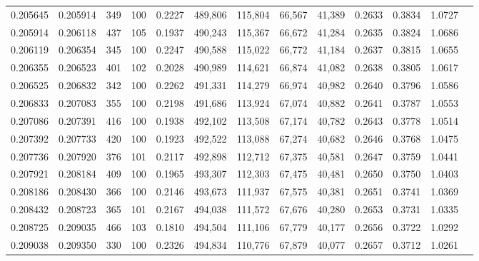 \begin{tabular}{rrrrrrrrrrrrr}
0.205645 & 0.205914 &   349 & 100 &                                     0.2227 & 489,806 & 115,804 &  66,567 &  41,389 & 0.2633 & 0.3834 & 1.0727 \\
0.205914 & 0.206118 &   437 & 105 &                                     0.1937 & 490,243 & 115,367 &  66,672 &  41,284 & 0.2635 & 0.3824 & 1.0686 \\
0.206119 & 0.206354 &   345 & 100 &                                     0.2247 & 490,588 & 115,022 &  66,772 &  41,184 & 0.2637 & 0.3815 & 1.0655 \\
0.206355 & 0.206523 &   401 & 102 &                                     0.2028 & 490,989 & 114,621 &  66,874 &  41,082 & 0.2638 & 0.3805 & 1.0617 \\
0.206525 & 0.206832 &   342 & 100 &                                     0.2262 & 491,331 & 114,279 &  66,974 &  40,982 & 0.2640 & 0.3796 & 1.0586 \\
0.206833 & 0.207083 &   355 & 100 &                                     0.2198 & 491,686 & 113,924 &  67,074 &  40,882 & 0.2641 & 0.3787 & 1.0553 \\
0.207086 & 0.207391 &   416 & 100 &                                     0.1938 & 492,102 & 113,508 &  67,174 &  40,782 & 0.2643 & 0.3778 & 1.0514 \\
0.207392 & 0.207733 &   420 & 100 &                                     0.1923 & 492,522 & 113,088 &  67,274 &  40,682 & 0.2646 & 0.3768 & 1.0475 \\
0.207736 & 0.207920 &   376 & 101 &                                     0.2117 & 492,898 & 112,712 &  67,375 &  40,581 & 0.2647 & 0.3759 & 1.0441 \\
0.207921 & 0.208184 &   409 & 100 &                                     0.1965 & 493,307 & 112,303 &  67,475 &  40,481 & 0.2650 & 0.3750 & 1.0403 \\
0.208186 & 0.208430 &   366 & 100 &                                     0.2146 & 493,673 & 111,937 &  67,575 &  40,381 & 0.2651 & 0.3741 & 1.0369 \\
0.208432 & 0.208723 &   365 & 101 &                                     0.2167 & 494,038 & 111,572 &  67,676 &  40,280 & 0.2653 & 0.3731 & 1.0335 \\
0.208725 & 0.209035 &   466 & 103 &                                     0.1810 & 494,504 & 111,106 &  67,779 &  40,177 & 0.2656 & 0.3722 & 1.0292 \\
0.209038 & 0.209350 &   330 & 100 &                                     0.2326 & 494,834 & 110,776 &  67,879 &  40,077 & 0.2657 & 0.3712 & 1.0261 \\

\end{tabular}
